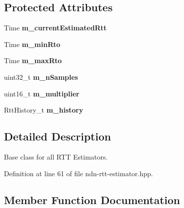 \subsection*{Protected Attributes}
\begin{DoxyCompactItemize}
\item 
Time {\bfseries m\+\_\+current\+Estimated\+Rtt}\hypertarget{classns3_1_1ndn_1_1RttEstimator_a9354e17746d8b7529ad9dd82415571f9}{}\label{classns3_1_1ndn_1_1RttEstimator_a9354e17746d8b7529ad9dd82415571f9}

\item 
Time {\bfseries m\+\_\+min\+Rto}\hypertarget{classns3_1_1ndn_1_1RttEstimator_a4d9d1072ded7a3ae5c7c5f831b064f60}{}\label{classns3_1_1ndn_1_1RttEstimator_a4d9d1072ded7a3ae5c7c5f831b064f60}

\item 
Time {\bfseries m\+\_\+max\+Rto}\hypertarget{classns3_1_1ndn_1_1RttEstimator_adb87ed5ce3615f20be524c25c5a17058}{}\label{classns3_1_1ndn_1_1RttEstimator_adb87ed5ce3615f20be524c25c5a17058}

\item 
uint32\+\_\+t {\bfseries m\+\_\+n\+Samples}\hypertarget{classns3_1_1ndn_1_1RttEstimator_abd26e0af35ffa74b0bbeb5f4af688b74}{}\label{classns3_1_1ndn_1_1RttEstimator_abd26e0af35ffa74b0bbeb5f4af688b74}

\item 
uint16\+\_\+t {\bfseries m\+\_\+multiplier}\hypertarget{classns3_1_1ndn_1_1RttEstimator_ab7f389855733b89d753b67a393a17dd2}{}\label{classns3_1_1ndn_1_1RttEstimator_ab7f389855733b89d753b67a393a17dd2}

\item 
Rtt\+History\+\_\+t {\bfseries m\+\_\+history}\hypertarget{classns3_1_1ndn_1_1RttEstimator_a2c90b3bf8b88d3840bbe9d38fb7d3c91}{}\label{classns3_1_1ndn_1_1RttEstimator_a2c90b3bf8b88d3840bbe9d38fb7d3c91}

\end{DoxyCompactItemize}


\subsection{Detailed Description}
Base class for all R\+TT Estimators. 

Definition at line 61 of file ndn-\/rtt-\/estimator.\+hpp.



\subsection{Member Function Documentation}
